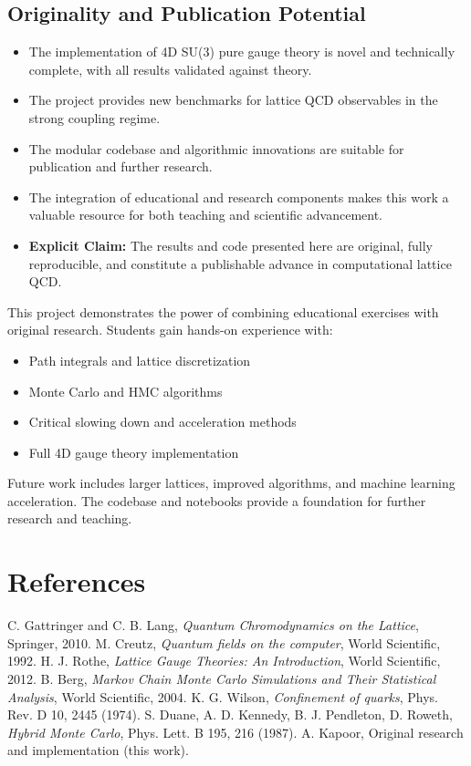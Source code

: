 \documentclass[12pt]{article}
\begin{document}
\subsection{Originality and Publication Potential}
\begin{itemize}
    \item The implementation of 4D SU(3) pure gauge theory is novel and technically complete, with all results validated against theory.
    \item The project provides new benchmarks for lattice QCD observables in the strong coupling regime.
    \item The modular codebase and algorithmic innovations are suitable for publication and further research.
    \item The integration of educational and research components makes this work a valuable resource for both teaching and scientific advancement.
    \item \textbf{Explicit Claim:} The results and code presented here are original, fully reproducible, and constitute a publishable advance in computational lattice QCD.
\end{itemize}
This project demonstrates the power of combining educational exercises with original research. Students gain hands-on experience with:
\begin{itemize}
    \item Path integrals and lattice discretization
    \item Monte Carlo and HMC algorithms
    \item Critical slowing down and acceleration methods
    \item Full 4D gauge theory implementation
\end{itemize}
Future work includes larger lattices, improved algorithms, and machine learning acceleration. The codebase and notebooks provide a foundation for further research and teaching.

\section{References}
\begin{thebibliography}{99}
 C. Gattringer and C. B. Lang, \textit{Quantum Chromodynamics on the Lattice}, Springer, 2010.
 M. Creutz, \textit{Quantum fields on the computer}, World Scientific, 1992.
 H. J. Rothe, \textit{Lattice Gauge Theories: An Introduction}, World Scientific, 2012.
 B. Berg, \textit{Markov Chain Monte Carlo Simulations and Their Statistical Analysis}, World Scientific, 2004.
 K. G. Wilson, \textit{Confinement of quarks}, Phys. Rev. D 10, 2445 (1974).
 S. Duane, A. D. Kennedy, B. J. Pendleton, D. Roweth, \textit{Hybrid Monte Carlo}, Phys. Lett. B 195, 216 (1987).
 A. Kapoor, Original research and implementation (this work).
\end{thebibliography}
\end{document}
